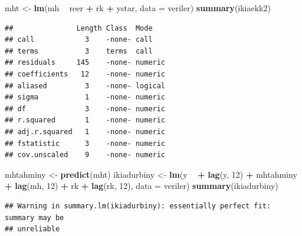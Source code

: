 \documentclass[]{article}
\newenvironment{Shaded}{\begin{snugshade}}{\end{snugshade}}
\newcommand{\KeywordTok}[1]{\textcolor[rgb]{0.13,0.29,0.53}{\textbf{#1}}}
\newcommand{\DataTypeTok}[1]{\textcolor[rgb]{0.13,0.29,0.53}{#1}}
\newcommand{\DecValTok}[1]{\textcolor[rgb]{0.00,0.00,0.81}{#1}}
\newcommand{\StringTok}[1]{\textcolor[rgb]{0.31,0.60,0.02}{#1}}
\newcommand{\OperatorTok}[1]{\textcolor[rgb]{0.81,0.36,0.00}{\textbf{#1}}}
\newcommand{\NormalTok}[1]{#1}
\begin{document}
\begin{Shaded}
\begin{Highlighting}[]
\NormalTok{mht <-}\StringTok{ }\KeywordTok{lm}\NormalTok{(mh }\OperatorTok{~}\StringTok{ }\NormalTok{reer }\OperatorTok{+}\StringTok{ }\NormalTok{rk }\OperatorTok{+}\StringTok{ }\NormalTok{ystar, }\DataTypeTok{data =}\NormalTok{ veriler)}
\KeywordTok{summary}\NormalTok{(ikiaekk2)}
\end{Highlighting}
\end{Shaded}

\begin{verbatim}
##               Length Class  Mode   
## call            3    -none- call   
## terms           3    terms  call   
## residuals     145    -none- numeric
## coefficients   12    -none- numeric
## aliased         3    -none- logical
## sigma           1    -none- numeric
## df              3    -none- numeric
## r.squared       1    -none- numeric
## adj.r.squared   1    -none- numeric
## fstatistic      3    -none- numeric
## cov.unscaled    9    -none- numeric
\end{verbatim}

\begin{Shaded}
\begin{Highlighting}[]
\NormalTok{mhtahminy <-}\StringTok{ }\KeywordTok{predict}\NormalTok{(mht)}
\NormalTok{ikiadurbiny <-}\StringTok{ }\KeywordTok{lm}\NormalTok{(y }\OperatorTok{~}\StringTok{ }\OperatorTok{+}\StringTok{ }\KeywordTok{lag}\NormalTok{(y, }\DecValTok{12}\NormalTok{) }\OperatorTok{+}\StringTok{ }\NormalTok{mhtahminy }\OperatorTok{+}\StringTok{ }\KeywordTok{lag}\NormalTok{(mh, }\DecValTok{12}\NormalTok{) }\OperatorTok{+}\StringTok{ }\NormalTok{rk }\OperatorTok{+}\StringTok{ }\KeywordTok{lag}\NormalTok{(rk, }\DecValTok{12}\NormalTok{), }\DataTypeTok{data =}\NormalTok{ veriler)}
\KeywordTok{summary}\NormalTok{(ikiadurbiny)}
\end{Highlighting}
\end{Shaded}

\begin{verbatim}
## Warning in summary.lm(ikiadurbiny): essentially perfect fit: summary may be
## unreliable
\end{verbatim}
\end{document}
